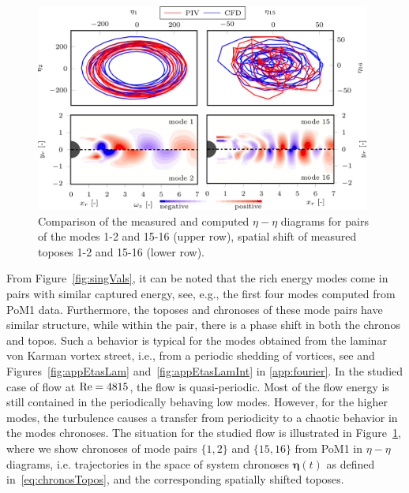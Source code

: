 \begin{figure}[htbp]
    \centering
    \includegraphics[width=0.98\textwidth]{02_images/00_export/figure10.png}
    \caption{Comparison of the measured and computed $\eta-\eta$ diagrams for pairs of the modes 1-2 and 15-16 (upper row), spatial shift of measured toposes 1-2 and 15-16 (lower row).}
    \label{fig:etaVsEta}
\end{figure}

{From} Figure~\ref{fig:singVals}, {it can be noted} that {the} rich energy modes come in pairs with similar captured energy{, see, e.g., the first four modes computed from PoM1 data}. Furthermore, {the} toposes and chronoses {of these mode pairs} have similar structure, while {within} the pair, {there is a phase shift in both the chronos and topos.} {Such a } behavior is typical for the {modes obtained from the} laminar von Karman vortex street, i.e., from a periodic shedding of vortices, {see \citep{taira2020,isoz2018} and Figures~\ref{fig:appEtasLam} and~\ref{fig:appEtasLamInt} in \ref{app:fourier}}. In the studied case {of flow at $\mathrm{Re} = 4815$, the flow is quasi-periodic. Most of the flow energy is still contained in the periodically behaving low modes. However, for the higher modes, the turbulence causes a transfer from periodicity to a chaotic behavior in the modes chronoses. The situation {for the studied flow} is illustrated in Figure~\ref{fig:etaVsEta}, where we show chronoses of mode pairs $\{1,2\}$ and $\{15,16\}$ from PoM1 in $\eta-\eta$ diagrams{, i.e. trajectories in the space of system chronoses $\bm{\eta}(t)$ as defined in~\eqref{eq:chronosTopos}}, and the corresponding spatially shifted toposes.}

